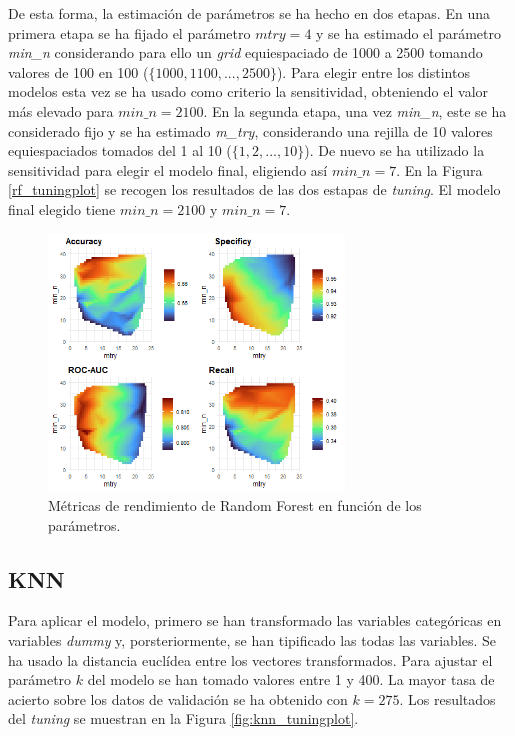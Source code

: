 \documentclass[12pt,a4paper,]{book}
\newcounter{dummy}
\numberwithin{dummy}{section}
\theoremstyle{ocrenumbox}
\theoremstyle{blacknumex}
\theoremstyle{blacknumbox}
\theoremstyle{ocrenum}
\theoremstyle{ocrenum}
\begin{document}
De esta forma, la estimación de parámetros se ha hecho en dos etapas. En
una primera etapa se ha fijado el parámetro \(mtry = 4\) y se ha
estimado el parámetro \emph{min\_n} considerando para ello un
\emph{grid} equiespaciado de 1000 a 2500 tomando valores de 100 en 100
(\(\{1000,1100,...,2500\}\)). Para elegir entre los distintos modelos
esta vez se ha usado como criterio la sensitividad, obteniendo el valor
más elevado para \(min\_n = 2100\). En la segunda etapa, una vez
\emph{min\_n}, este se ha considerado fijo y se ha estimado
\emph{m\_try}, considerando una rejilla de 10 valores equiespaciados
tomados del 1 al 10 (\(\{1,2,...,10\}\)). De nuevo se ha utilizado la
sensitividad para elegir el modelo final, eligiendo así \(min\_n = 7\).
En la Figura \ref{rf_tuningplot} se recogen los resultados de las dos
estapas de \emph{tuning}. El modelo final elegido tiene
\(min\_n = 2100\) y \(min\_n = 7\).

\begin{figure}[h!]
\centering
\includegraphics[width =0.7\textwidth]{graficos/rf_tuningplot.png}
\caption{Métricas de rendimiento de Random Forest en función de los parámetros.}
\label{fig:rf_tuningplot}
\end{figure}

\hypertarget{knn}{%
\subsection{KNN}\label{knn}}

Para aplicar el modelo, primero se han transformado las variables
categóricas en variables \emph{dummy} y, porsteriormente, se han
tipificado las todas las variables. Se ha usado la distancia euclídea
entre los vectores transformados. Para ajustar el parámetro \(k\) del
modelo se han tomado valores entre 1 y 400. La mayor tasa de acierto
sobre los datos de validación se ha obtenido con \(k = 275\). Los
resultados del \emph{tuning} se muestran en la Figura
\ref{fig:knn_tuningplot}.
\end{document}
